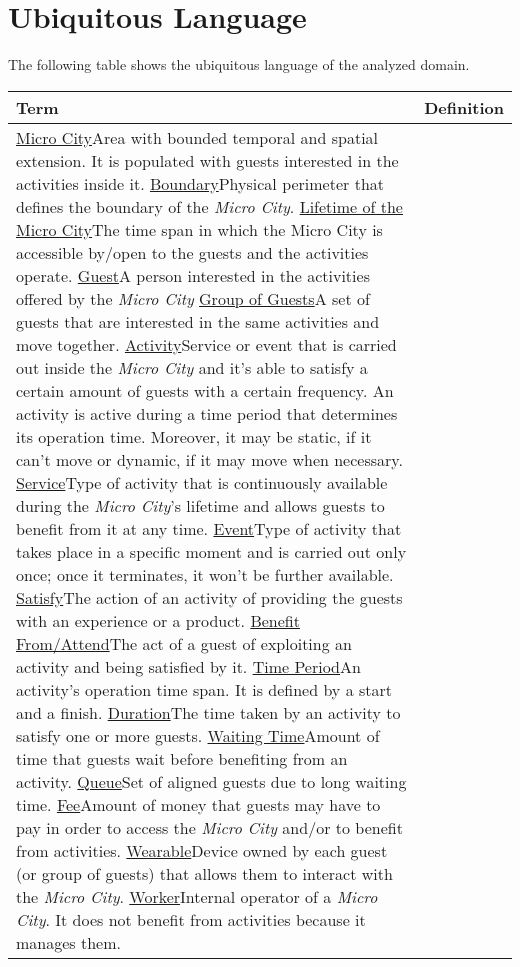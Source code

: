 \section{Ubiquitous Language}\label{sec:ubiquitous-language}

The following table shows the ubiquitous language of the analyzed domain.

\begin{longtable}{|l|p{}|}
	\hline
	\textbf{Term} & \textbf{Definition} \\
	\hline
	\ul{Micro City}{Area with bounded temporal and spatial extension. It is populated with guests interested in the activities inside it.}
	\ul{Boundary}{Physical perimeter that defines the boundary of the \textit{Micro City}.}
	\ul{Lifetime of the Micro City}{The time span in which the Micro City is accessible by/open to the guests and the activities operate.}
	\ul{Guest}{A person interested in the activities offered by the \textit{Micro City}}
	\ul{Group of Guests}{A set of guests that are interested in the same activities and move together.}
	\ul{Activity}{Service or event that is carried out inside the \textit{Micro City} and it's able to satisfy a certain amount of guests with a certain frequency. An activity is active during a time period that determines its operation time. Moreover, it may be static, if it can't move or dynamic, if it may move when necessary.}
	\ul{Service}{Type of activity that is continuously available during the \textit{Micro City}'s lifetime and allows guests to benefit from it at any time.}
	\ul{Event}{Type of activity that takes place in a specific moment and is carried out only once; once it terminates, it won't be further available.}
	\ul{Satisfy}{The action of an activity of providing the guests with an experience or a product.}
	\ul{Benefit From/Attend}{The act of a guest of exploiting an activity and being satisfied by it.}
	\ul{Time Period}{An activity's operation time span. It is defined by a start and a finish.}
	\ul{Duration}{The time taken by an activity to satisfy one or more guests.}
	\ul{Waiting Time}{Amount of time that guests wait before benefiting from an activity.}
	\ul{Queue}{Set of aligned guests due to long waiting time.}
	\ul{Fee}{Amount of money that guests may have to pay in order to access the \textit{Micro City} and/or to benefit from activities.}
	\ul{Wearable}{Device owned by each guest (or group of guests) that allows them to interact with the \textit{Micro City}.}
	\ul{Worker}{Internal operator of a \textit{Micro City}. It does not benefit from activities because it manages them.}

\end{longtable}
